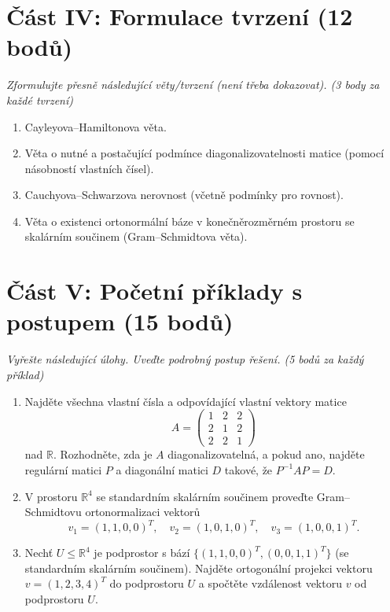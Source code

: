 \documentclass[a4paper,11pt]{article}
\begin{document}
\vspace{0.5cm}

\section*{Část IV: Formulace tvrzení (12 bodů)}
\textit{Zformulujte přesně následující věty/tvrzení (není třeba dokazovat). (3 body za každé tvrzení)}

\begin{enumerate}
    \item Cayleyova--Hamiltonova věta.
    \item Věta o nutné a postačující podmínce diagonalizovatelnosti matice (pomocí násobností vlastních čísel).
    \item Cauchyova--Schwarzova nerovnost (včetně podmínky pro rovnost).
    \item Věta o existenci ortonormální báze v konečněrozměrném prostoru se skalárním součinem (Gram--Schmidtova věta).
\end{enumerate}

\newpage

\section*{Část V: Početní příklady s postupem (15 bodů)}
\textit{Vyřešte následující úlohy. Uveďte podrobný postup řešení. (5 bodů za každý příklad)}

\begin{enumerate}
    \item Najděte všechna vlastní čísla a odpovídající vlastní vektory matice 
    $$A = \begin{pmatrix} 1 & 2 & 2 \\ 2 & 1 & 2 \\ 2 & 2 & 1 \end{pmatrix}$$
    nad $\mathbb{R}$. Rozhodněte, zda je $A$ diagonalizovatelná, a pokud ano, najděte regulární matici $P$ a diagonální matici $D$ takové, že $P^{-1} A P = D$.
    
    \item V prostoru $\mathbb{R}^4$ se standardním skalárním součinem proveďte Gram--Schmidtovu ortonormalizaci vektorů 
    $$v_1 = (1, 1, 0, 0)^T, \quad v_2 = (1, 0, 1, 0)^T, \quad v_3 = (1, 0, 0, 1)^T.$$
    
    \item Nechť $U \leq \mathbb{R}^4$ je podprostor s bází $\{(1, 1, 0, 0)^T, (0, 0, 1, 1)^T\}$ (se standardním skalárním součinem). Najděte ortogonální projekci vektoru $v = (1, 2, 3, 4)^T$ do podprostoru $U$ a spočtěte vzdálenost vektoru $v$ od podprostoru $U$.
\end{enumerate}
\end{document}
